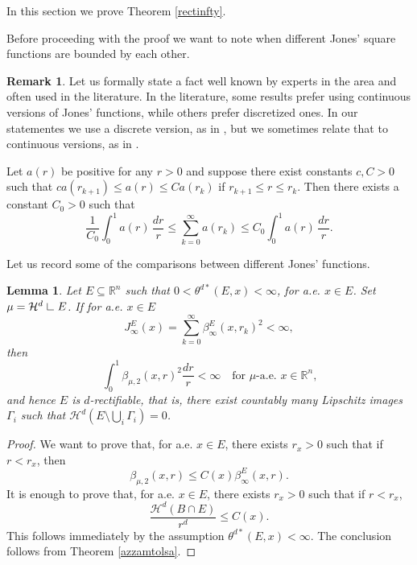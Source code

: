 \documentclass[11pt, twoside, leqno]{article}
\numberwithin{equation}{section}
\theoremstyle{plain}
\newtheorem{lem}[thm]{Lemma}
\theoremstyle{definition}
\newtheorem{rk}[thm]{Remark}
\newcommand{\R}{\mathbb{R}}
\newcommand{\res}{\hbox{ {\vrule height .22cm}{\leaders\hrule\hskip.2cm} }} %
\begin{document}
In this section we prove Theorem \ref{rectinfty}.

Before proceeding with the proof we want to note when different Jones' square functions are bounded by each other. 
\begin{rk}
Let us formally state a fact well known by experts in the area and often used in the literature. In the literature, some results prefer using continuous versions of Jones' functions, while others prefer discretized ones. In our statementes we use a discrete version, as in \cite{davidtoro}, but we sometimes relate that to continuous versions, as in \cite{ATII}.

Let $a(r)$ be positive for any $r>0$ and suppose there exist constants $c,C>0$ such that $ca(r_{k+1}) \leq a(r) \leq C a(r_k)$ if $r_{k+1} \leq r \leq r_k$. Then there exists a constant $C_0>0$ such that
\begin{equation}
\frac{1}{C_0}\int_0^1 a(r)\,\frac{dr}{r} \leq \sum_{k=0}^{\infty} a(r_k) \leq C_0  \int_0^1 a(r)\,\frac{dr}{r}.
\end{equation}
\end{rk}

Let us record some of the comparisons between different Jones' functions.

\begin{lem} \label{beta2betainfty}
Let $E \subseteq \R^n$ such that $0<\theta^{d*}(E,x)<\infty$, for a.e. $x \in E$. Set $\mu=\mathcal{H}^d\res E$. If for a.e. $x \in E$
\begin{equation}
J^{E}_{\infty}(x)=\sum_{k=0}^{\infty} \beta^E_{\infty}(x,r_k)^2 < \infty,
\end{equation}
then
\begin{equation}
\int_0^1\beta_{\mu,2}(x,r)^2 \frac{dr}{r} < \infty \quad \text{for $\mu$-a.e. $x \in \R^n$,}
\end{equation}
and hence $E$ is $d$-rectifiable, that is, there exist countably many Lipschitz images $\Gamma_i$ such that $\mathcal{H}^d(E \setminus \bigcup_i \Gamma_i)=0$.
\end{lem}
\begin{proof}
We want to prove that, for a.e. $x \in E$, there exists $r_x>0$ such that if $r<r_x$, then
\begin{equation}
    \beta_{\mu,2}(x,r) \leq C(x) \beta^E_{\infty}(x,r).
\end{equation}
It is enough to prove that, for a.e. $x \in E$, there exists $r_x>0$ such that if $r<r_x$, 
\begin{equation}
    \frac{\mathcal{H}^d(B \cap E)}{r^d} \leq C(x).
\end{equation}
This follows immediately by the assumption $\theta^{d *}(E,x)<\infty$.
The conclusion follows from Theorem \ref{azzamtolsa}.
\end{proof}
\end{document}
